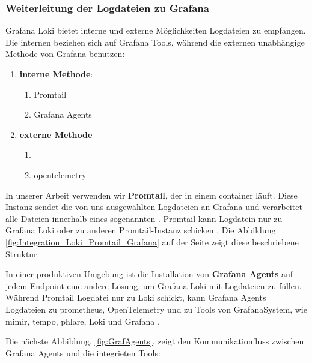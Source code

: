 \subsubsection{Weiterleitung der Logdateien zu Grafana}
Grafana Loki bietet interne und externe Möglichkeiten Logdateien zu empfangen. Die internen beziehen sich auf Grafana Tools, während die externen unabhängige Methode von Grafana benutzen:

\begin{enumerate}[noitemsep]
   \item \textbf{interne Methode}:
   \begin{enumerate}[noitemsep]
      \item Promtail 
      \item Grafana Agents
   \end{enumerate}
   \item \textbf{externe Methode}
   \begin{enumerate}[noitemsep]
      \item {}
      \item \gls{opentelemetry} 
   \end{enumerate}
\end{enumerate}

In unserer Arbeit verwenden wir \textbf{Promtail}, der in einem \gls{container} läuft. Diese Instanz sendet die von uns ausgewählten Logdateien an Grafana und verarbeitet alle Dateien innerhalb eines sogenannten . Promtail kann Logdatein nur zu Grafana Loki oder zu anderen Promtail-Instanz schicken \citep{Grafana_Promtail}. Die Abbildung \ref{fig:Integration_Loki_Promtail_Grafana} auf der Seite \pageref{fig:Integration_Loki_Promtail_Grafana} zeigt diese beschriebene Struktur. 

In einer produktiven Umgebung ist die Installation von \textbf{Grafana Agents} auf jedem \gls{Endpoint} eine andere Lösung, um Grafana Loki mit Logdateien zu füllen. Während Promtail Logdatei nur zu Loki schickt, kann Grafana Agents Logdateien zu \gls{prometheus}, OpenTelemetry und zu Tools von \gls{GrafanaSystem}, wie \gls{mimir}, \gls{tempo}, \gls{phlare}, Loki und Grafana \citep{Grafana_Agents}. 

\newpage
Die nächste Abbildung, \ref{fig:GrafAgents}, zeigt den Kommunikationfluss zwischen Grafana Agents und die integrieten Tools:

